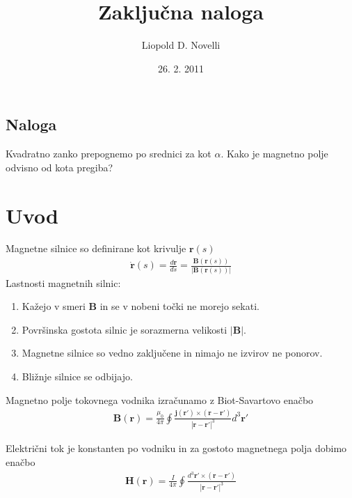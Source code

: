 \documentclass[12pt, a4paper]{article}
\begin{document}
\title{Zaključna naloga}
\author{Liopold D. Novelli}
\date{26. 2. 2011}
\maketitle

\subsection{Naloga}

Kvadratno zanko prepognemo po srednici za kot $\alpha$. Kako je magnetno polje odvisno od kota pregiba?

\section{Uvod}

Magnetne silnice so definirane kot krivulje $\mathbf{r}(s)$
\begin{eqnarray}
  \mathbf{\dot{r}}(s) = \frac{d \mathbf{r}}{ds} = \frac{\mathbf{B}(\mathbf{r}(s))}{|\mathbf{B}(\mathbf{r}(s))|}
\end{eqnarray}
Lastnosti magnetnih silnic:
\begin{enumerate}
\item Kažejo v smeri $\mathbf{B}$ in se v nobeni točki ne morejo sekati.
\item Površinska gostota silnic je sorazmerna velikosti $|\mathbf{B}|$.
\item Magnetne silnice so vedno zaključene in nimajo ne izvirov ne ponorov.
\item Bližnje silnice se odbijajo.
\end{enumerate}


Magnetno polje tokovnega vodnika izračunamo z Biot-Savartovo enačbo
\begin{eqnarray}
  \mathbf{B}(\mathbf{r}) = \frac{\mu_0}{4\pi}\oint\frac{ \mathbf{j}( \mathbf{r'}) \times( \mathbf{r}- \mathbf{r'})}{| \mathbf{r} -  \mathbf{r'}|^3} d^3 \mathbf{r'}
\end{eqnarray}
\begin{comment}
  Enačba za električni tok:
\begin{eqnarray}
   \mathbf{j}( \mathbf{r}) = \oint I d \mathbf{r'}
\end{eqnarray}
\end{comment}
Električni tok je konstanten po vodniku in za gostoto magnetnega polja dobimo enačbo
\begin{eqnarray}
   \mathbf{H}(\mathbf{r}) = \frac{I}{4\pi}\oint\frac{ d^3\mathbf{r'} \times( \mathbf{r}- \mathbf{r'})}{| \mathbf{r} -  \mathbf{r'}|^3}
\end{eqnarray}
\end{document}
